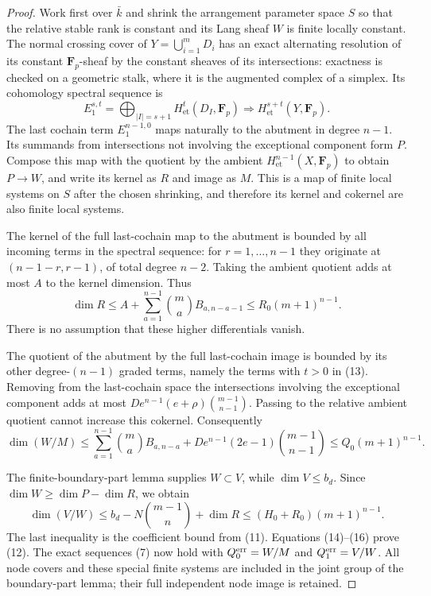 \begin{proof}
Work first over $\bar k$ and shrink the arrangement
parameter space $S$ so that the relative stable rank is
constant and its Lang sheaf $W$ is finite locally constant.
The normal crossing cover of $Y=\bigcup_{i=1}^mD_i$
has an exact alternating resolution of its constant
$\mathbf F_p$-sheaf by the constant sheaves of its
intersections: exactness is checked on a geometric
stalk, where it is the augmented complex of a simplex.
Its cohomology spectral sequence is
\[
 E_1^{s,t}=
 \bigoplus_{|I|=s+1}
 H^t_{\mathrm{et}}(D_I,\mathbf F_p)
 \Longrightarrow H^{s+t}_{\mathrm{et}}(Y,\mathbf F_p).
 \tag{13}
\]
The last cochain term $E_1^{n-1,0}$ maps naturally to the
abutment in degree $n-1$.  Its summands from intersections
not involving the exceptional component form $P$.
Compose this map with the quotient by the ambient
$H^{n-1}_{\mathrm{et}}(X,\mathbf F_p)$ to obtain
$P\to W$, and write its kernel as $R$ and image as $M$.
This is a map of finite local systems on $S$ after the
chosen shrinking, and therefore its kernel and cokernel
are also finite local systems.

The kernel of the full last-cochain map to the abutment
is bounded by all incoming terms in the spectral sequence:
for $r=1,\ldots,n-1$ they originate at
$(n-1-r,r-1)$, of total degree $n-2$.
Taking the ambient quotient adds at most $A$ to the
kernel dimension.  Thus
\[
 \dim R\leq A+
       \sum_{a=1}^{n-1}\binom ma B_{a,n-a-1}
       \leq R_0(m+1)^{n-1}.
 \tag{14}
\]
There is no assumption that these higher differentials
vanish.

The quotient of the abutment by the full last-cochain
image is bounded by its other degree-$(n-1)$ graded terms,
namely the terms with $t>0$ in (13).  Removing from the
last-cochain space the intersections involving the
exceptional component adds at most
$D e^{n-1}(e+\rho)\binom{m-1}{n-1}$.
Passing to the relative ambient quotient cannot increase
this cokernel.  Consequently
\[
 \dim(W/M)\leq
 \sum_{a=1}^{n-1}\binom ma B_{a,n-a}
 +D e^{n-1}(2e-1)\binom{m-1}{n-1}
 \leq Q_0(m+1)^{n-1}.
 \tag{15}
\]

The finite-boundary-part lemma supplies $W\subset V$,
while $\dim V\leq b_d$.  Since
$\dim W\geq\dim P-\dim R$, we obtain
\[
 \dim(V/W)
 \leq b_d-N\binom{m-1}{n}+\dim R
 \leq(H_0+R_0)(m+1)^{n-1}.
 \tag{16}
\]
The last inequality is the coefficient bound from (11).
Equations (14)--(16) prove (12).
The exact sequences (7) now hold with
$Q_0^{\rm err}=W/M$ and $Q_1^{\rm err}=V/W$.
All node covers and these special finite systems are
included in the joint group of the boundary-part lemma;
their full independent node image is retained.
\end{proof}

